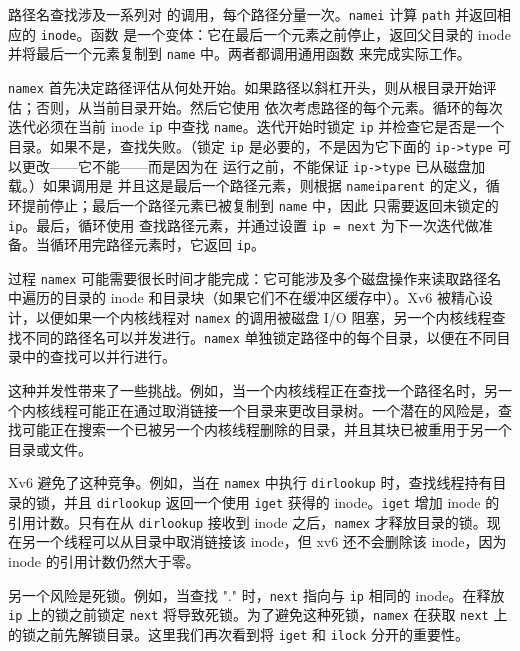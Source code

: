 路径名查找涉及一系列对  的调用，每个路径分量一次。\lstinline{namei} 计算 \lstinline{path} 并返回相应的 \lstinline{inode}。函数  是一个变体：它在最后一个元素之前停止，返回父目录的 inode 并将最后一个元素复制到 \lstinline{name} 中。两者都调用通用函数  来完成实际工作。

\lstinline{namex} 首先决定路径评估从何处开始。如果路径以斜杠开头，则从根目录开始评估；否则，从当前目录开始。然后它使用  依次考虑路径的每个元素。循环的每次迭代必须在当前 inode \lstinline{ip} 中查找 \lstinline{name}。迭代开始时锁定 \lstinline{ip} 并检查它是否是一个目录。如果不是，查找失败。（锁定 \lstinline{ip} 是必要的，不是因为它下面的 \lstinline{ip->type} 可以更改——它不能——而是因为在  运行之前，不能保证 \lstinline{ip->type} 已从磁盘加载。）如果调用是  并且这是最后一个路径元素，则根据 \lstinline{nameiparent} 的定义，循环提前停止；最后一个路径元素已被复制到 \lstinline{name} 中，因此  只需要返回未锁定的 \lstinline{ip}。最后，循环使用  查找路径元素，并通过设置 \lstinline{ip = next} 为下一次迭代做准备。当循环用完路径元素时，它返回 \lstinline{ip}。

过程 \lstinline{namex} 可能需要很长时间才能完成：它可能涉及多个磁盘操作来读取路径名中遍历的目录的 inode 和目录块（如果它们不在缓冲区缓存中）。Xv6 被精心设计，以便如果一个内核线程对 \lstinline{namex} 的调用被磁盘 I/O 阻塞，另一个内核线程查找不同的路径名可以并发进行。\lstinline{namex} 单独锁定路径中的每个目录，以便在不同目录中的查找可以并行进行。

这种并发性带来了一些挑战。例如，当一个内核线程正在查找一个路径名时，另一个内核线程可能正在通过取消链接一个目录来更改目录树。一个潜在的风险是，查找可能正在搜索一个已被另一个内核线程删除的目录，并且其块已被重用于另一个目录或文件。

Xv6 避免了这种竞争。例如，当在 \lstinline{namex} 中执行 \lstinline{dirlookup} 时，查找线程持有目录的锁，并且 \lstinline{dirlookup} 返回一个使用 \lstinline{iget} 获得的 inode。\lstinline{iget} 增加 inode 的引用计数。只有在从 \lstinline{dirlookup} 接收到 inode 之后，\lstinline{namex} 才释放目录的锁。现在另一个线程可以从目录中取消链接该 inode，但 xv6 还不会删除该 inode，因为 inode 的引用计数仍然大于零。

另一个风险是死锁。例如，当查找 "." 时，\lstinline{next} 指向与 \lstinline{ip} 相同的 inode。在释放 \lstinline{ip} 上的锁之前锁定 \lstinline{next} 将导致死锁。为了避免这种死锁，\lstinline{namex} 在获取 \lstinline{next} 上的锁之前先解锁目录。这里我们再次看到将 \lstinline{iget} 和 \lstinline{ilock} 分开的重要性。
